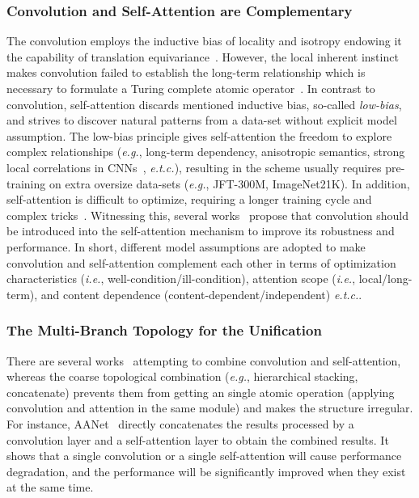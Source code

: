 \documentclass{article}
\begin{document}
\subsubsection{Convolution and Self-Attention are Complementary}
The convolution employs the inductive bias of locality and isotropy endowing it the capability of translation equivariance~\cite{DBLP:conf/iccv/BelloZLVS19}.
However, the local inherent instinct makes convolution failed to establish the long-term relationship which is necessary to formulate a Turing complete atomic operator~\cite{DBLP:conf/iclr/CordonnierLJ20,DBLP:conf/iclr/PerezMB19}. 
In contrast to convolution, self-attention discards mentioned inductive bias, so-called \emph{low-bias}, and strives to discover natural patterns from a data-set without explicit model assumption.
The low-bias principle gives self-attention the freedom to explore complex relationships (\emph{e.g.}, long-term dependency, anisotropic semantics, strong local correlations in CNNs~\cite{DBLP:journals/corr/abs-2012-09841},  \emph{e.t.c.}), resulting in the scheme usually requires pre-training on extra oversize data-sets (\emph{e.g.}, JFT-300M, ImageNet21K).
In addition, self-attention is difficult to optimize, requiring a longer training cycle and complex tricks~\cite{DBLP:journals/corr/abs-2103-12731,DBLP:journals/corr/abs-2103-14030,DBLP:journals/corr/abs-2010-04159,DBLP:conf/eccv/CarionMSUKZ20}.
Witnessing this, several works~\cite{DBLP:conf/iccv/BelloZLVS19,DBLP:journals/corr/abs-2103-15808} propose that convolution should be introduced into the self-attention mechanism to improve its robustness and performance.
In short, different model assumptions are adopted to make convolution and self-attention complement each other in terms of optimization characteristics (\emph{i.e.}, well-condition/ill-condition), attention scope (\emph{i.e.}, local/long-term), and content dependence (content-dependent/independent) \emph{e.t.c.}.


\subsubsection{The Multi-Branch Topology for the Unification}

There are several works~\cite{DBLP:journals/corr/abs-2103-15808,DBLP:conf/iccv/BelloZLVS19} attempting to combine convolution and self-attention, whereas the coarse topological combination (\emph{e.g.}, hierarchical stacking, concatenate) prevents them from getting an single atomic operation (applying convolution and attention in the same module) and makes the structure irregular.
For instance, AANet~\cite{DBLP:conf/iccv/BelloZLVS19} directly concatenates the results processed by a convolution layer and a self-attention layer to obtain the combined results.
It shows that a single convolution or a single self-attention will cause performance degradation, and the performance will be significantly improved when they exist at the same time.
\end{document}

